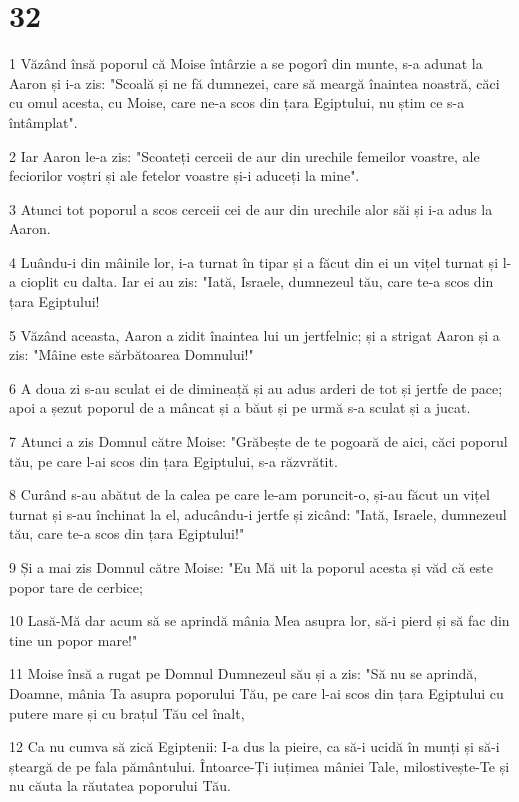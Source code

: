 \chapter{32}

\par 1 Văzând însă poporul că Moise întârzie a se pogorî din munte, s-a adunat la Aaron și i-a zis: "Scoală și ne fă dumnezei, care să meargă înaintea noastră, căci cu omul acesta, cu Moise, care ne-a scos din țara Egiptului, nu știm ce s-a întâmplat".
\par 2 Iar Aaron le-a zis: "Scoateți cerceii de aur din urechile femeilor voastre, ale feciorilor voștri și ale fetelor voastre și-i aduceți la mine".
\par 3 Atunci tot poporul a scos cerceii cei de aur din urechile alor săi și i-a adus la Aaron.
\par 4 Luându-i din mâinile lor, i-a turnat în tipar și a făcut din ei un vițel turnat și l-a cioplit cu dalta. Iar ei au zis: "Iată, Israele, dumnezeul tău, care te-a scos din țara Egiptului!
\par 5 Văzând aceasta, Aaron a zidit înaintea lui un jertfelnic; și a strigat Aaron și a zis: "Mâine este sărbătoarea Domnului!"
\par 6 A doua zi s-au sculat ei de dimineață și au adus arderi de tot și jertfe de pace; apoi a șezut poporul de a mâncat și a băut și pe urmă s-a sculat și a jucat.
\par 7 Atunci a zis Domnul către Moise: "Grăbește de te pogoară de aici, căci poporul tău, pe care l-ai scos din țara Egiptului, s-a răzvrătit.
\par 8 Curând s-au abătut de la calea pe care le-am poruncit-o, și-au făcut un vițel turnat și s-au închinat la el, aducându-i jertfe și zicând: "Iată, Israele, dumnezeul tău, care te-a scos din țara Egiptului!"
\par 9 Și a mai zis Domnul către Moise: "Eu Mă uit la poporul acesta și văd că este popor tare de cerbice;
\par 10 Lasă-Mă dar acum să se aprindă mânia Mea asupra lor, să-i pierd și să fac din tine un popor mare!"
\par 11 Moise însă a rugat pe Domnul Dumnezeul său și a zis: "Să nu se aprindă, Doamne, mânia Ta asupra poporului Tău, pe care l-ai scos din țara Egiptului cu putere mare și cu brațul Tău cel înalt,
\par 12 Ca nu cumva să zică Egiptenii: I-a dus la pieire, ca să-i ucidă în munți și să-i șteargă de pe fala pământului. Întoarce-Ți iuțimea mâniei Tale, milostivește-Te și nu căuta la răutatea poporului Tău.
